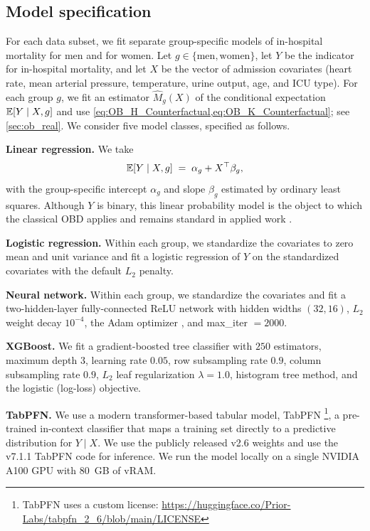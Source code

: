 \subsection*{Model specification}

For each data subset, we fit separate group-specific models of in-hospital mortality for men and for women. Let $g \in \{\text{men}, \text{women}\}$, let $Y$ be the indicator for in-hospital mortality, and let $X$ be the vector of admission covariates (heart rate, mean arterial pressure, temperature, urine output, age, and ICU type). For each group $g$, we fit an estimator $\hat{M}_g(X)$ of the conditional expectation $\mathbb{E}[Y \mid X, g]$ and use \cref{eq:OB_H_Counterfactual,eq:OB_K_Counterfactual}; see \cref{sec:ob_real}. We consider five model classes, specified as follows.

\textbf{Linear regression.} We take
\[
    \mathbb{E}[Y \mid X, g] \;=\; \alpha_{g} + X^{\top}\beta_{g},
\]
with the group-specific intercept $\alpha_{g}$ and slope $\beta_{g}$ estimated by ordinary least squares. Although $Y$ is binary, this linear probability model is the object to which the classical OBD applies and remains standard in applied work \citep{jann2008, edokaChangesCatastrophicHealth2017, sujin_LPM_OB, mweembaGapSelfRatedHealth2023}.

\textbf{Logistic regression.} Within each group, we standardize the covariates to zero mean and unit variance and fit a logistic regression of $Y$ on the standardized covariates with the default $L_2$ penalty.

\textbf{Neural network.} Within each group, we standardize the covariates and fit a two-hidden-layer fully-connected ReLU network with hidden widths $(32, 16)$, $L_2$ weight decay $10^{-4}$, the Adam optimizer \citep{kingma2015adam}, and max\_iter $=2000$.

\textbf{XGBoost.} We fit a gradient-boosted tree classifier with $250$ estimators, maximum depth $3$, learning rate $0.05$, row subsampling rate $0.9$, column subsampling rate $0.9$, $L_2$ leaf regularization $\lambda = 1.0$, histogram tree method, and the logistic (log-loss) objective.

\textbf{TabPFN.} We use a modern transformer-based tabular model, TabPFN \citep{hollmann2023tabpfn}\footnote{TabPFN uses a custom license: \url{https://huggingface.co/Prior-Labs/tabpfn_2_6/blob/main/LICENSE}}, a pre-trained in-context classifier that maps a training set directly to a predictive distribution for $Y \mid X$. We use the publicly released v2.6 weights and use the v7.1.1 TabPFN code for inference. We run the model locally on a single NVIDIA A100 GPU with $80$~GB of vRAM.

